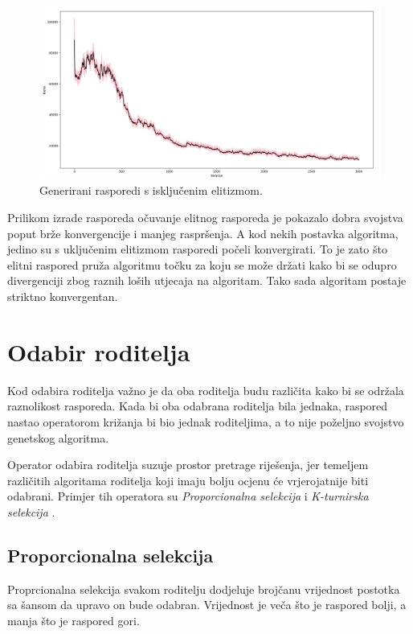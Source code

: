 \documentclass[times, utf8, zavrsni]{fer}
\begin{document}
\begin{figure}[htb]
\centering
\includegraphics[width=14cm]{images/elitizam_ne.png}
\caption{Generirani rasporedi s isključenim elitizmom.}
\label{fig:elitiziam_ne}
\end{figure}

Prilikom izrade rasporeda očuvanje elitnog rasporeda je pokazalo dobra svojstva poput brže konvergencije i manjeg raspršenja. A kod nekih postavka algoritma, jedino su s uključenim elitizmom rasporedi počeli konvergirati. To je zato što elitni raspored pruža algoritmu točku za koju se može držati kako bi se odupro divergenciji zbog raznih loših utjecaja na algoritam. Tako sada algoritam postaje striktno konvergentan.

\section{Odabir roditelja}

Kod odabira roditelja važno je da oba roditelja budu različita kako bi se održala raznolikost rasporeda. Kada bi oba odabrana roditelja bila jednaka, raspored nastao operatorom križanja bi bio jednak roditeljima, a to nije poželjno svojstvo genetskog algoritma.

Operator odabira roditelja suzuje prostor pretrage riješenja, jer temeljem različitih algoritama roditelja koji imaju bolju ocjenu će vrjerojatnije biti odabrani. Primjer tih operatora su \emph{Proporcionalna selekcija}  i \emph{K-turnirska selekcija} .

\subsection{Proporcionalna selekcija}

Proprcionalna selekcija svakom roditelju dodjeluje brojčanu vrijednost postotka sa šansom da upravo on bude odabran. Vrijednost je veča što je raspored bolji, a manja što je raspored gori.
\end{document}
